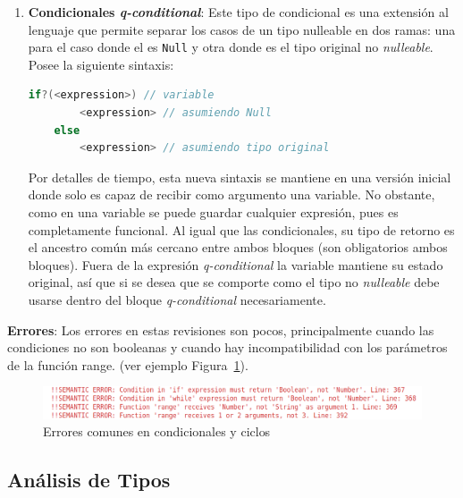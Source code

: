 \documentclass{llncs}
\begin{document}
\begin{enumerate}
\begin{lstlisting}[language=C]
    // ---> Transformacion <---
    let _iter = start - 1 in 
    // _ al inicio evita que el usuario pueda usarla
        if (_iter += 1 < end) // por si no entra al while
            while (_iter += 1 < end)
                let x = _iter in {
                    // cuerpo del for
                }
    // Esta transformacion simula un iterable
    \end{lstlisting}
    \item \textbf{Condicionales \textit{q-conditional}}: Este tipo de condicional es una extensión al lenguaje que permite separar los casos de un tipo nulleable en dos ramas: una para el caso donde el es \texttt{Null} y otra donde es el tipo original no \textit{nulleable}. Posee 
    la siguiente sintaxis: 
    \begin{lstlisting}[language=C]
    if?(<expression>) // variable
        <expression> // asumiendo Null
    else 
        <expression> // asumiendo tipo original
    \end{lstlisting}
    Por detalles de tiempo, esta nueva sintaxis se mantiene en una versión inicial donde solo es capaz de recibir como argumento una variable. No obstante, como en una variable se puede guardar cualquier expresión, pues es completamente funcional. Al igual que las condicionales, su tipo de 
    retorno es el ancestro común más cercano entre ambos bloques (son obligatorios ambos bloques). Fuera de la expresión \textit{q-conditional} la variable mantiene su estado original, así que si se desea que se comporte como el tipo no \textit{nulleable} debe usarse dentro del bloque \textit{q-conditional} 
    necesariamente.
\end{enumerate}

\textbf{Errores}: Los errores en estas revisiones son pocos, principalmente cuando las condiciones no son booleanas y cuando hay incompatibilidad con los parámetros de la función range. (ver ejemplo Figura~\ref{fig:errores_4}).
\begin{figure}[h]
\centering
\includegraphics[width=1\textwidth]{images/cond-loop_errors.png}
\caption{Errores comunes en condicionales y ciclos}
\label{fig:errores_4}
\end{figure}

\subsection{Análisis de Tipos}
\end{document}
